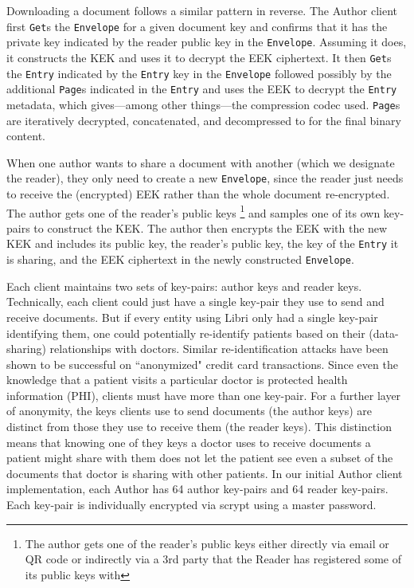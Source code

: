 \documentclass[10pt]{article}
\newcommand{\ttt}[1]{\texttt{#1}}
\def\Entry{\ttt{Entry}}
\def\Page{\ttt{Page}}
\def\Envelope{\ttt{Envelope}}
\begin{document}
Downloading a document follows a similar pattern in reverse. The Author client first \ttt{Get}s the \Envelope{} for a given document key and confirms that it has the private key indicated by the reader public key in the \Envelope{}. Assuming it does, it constructs the KEK and uses it to decrypt the EEK ciphertext. It then \texttt{Get}s the \Entry{} indicated by the \Entry{} key in the \Envelope{} followed possibly by the additional \Page{}s indicated in the \Entry{} and uses the EEK to decrypt the \Entry{} metadata, which gives---among other things---the compression codec used. \Page{}s are iteratively decrypted, concatenated, and decompressed to for the final binary content. 

When one author wants to share a document with another (which we designate the reader), they only need to create a new \Envelope{}, since the reader just needs to receive the (encrypted) EEK rather than the whole document re-encrypted. The author gets one of the reader's public keys \footnote{The author gets one of the reader's public keys either directly via email or QR code or indirectly via a 3rd party that the Reader has registered some of its public keys with} and samples one of its own key-pairs to construct the KEK. The author then encrypts the EEK with the new KEK and includes its public key, the reader's public key, the key of the \Entry{} it is sharing, and the EEK ciphertext in the newly constructed \Envelope{}. 

Each client maintains two sets of key-pairs: author keys and reader keys. Technically, each client could just have a single key-pair they use to send and receive documents. But if every entity using Libri only had a single key-pair identifying them, one could potentially re-identify patients based on their (data-sharing) relationships with doctors. Similar re-identification attacks have been shown to be successful on ``anonymized" credit card transactions. Since even the knowledge that a patient visits a particular doctor is protected health information (PHI), clients must have more than one key-pair. For a further layer of anonymity, the keys clients use to send documents (the author keys) are distinct from those they use to receive them (the reader keys). This distinction means that knowing one of they keys a doctor uses to receive documents a patient might share with them does not let the patient see even a subset of the documents that doctor is sharing with other patients. In our initial Author client implementation, each Author has 64 author key-pairs and 64 reader key-pairs. Each key-pair is individually encrypted via scrypt \cite{scrypt} using a master password.
\end{document}
